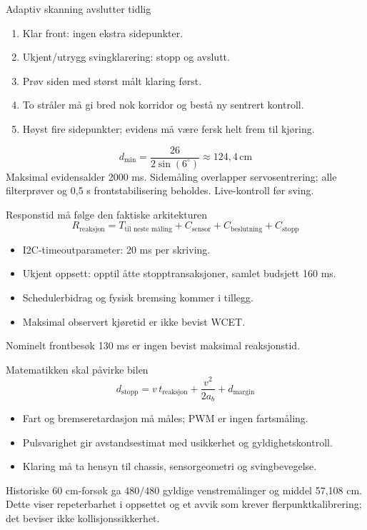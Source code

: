\documentclass[aspectratio=169,11pt]{beamer}
\begin{document}
\begin{frame}{Adaptiv skanning avslutter tidlig}
\begin{enumerate}
\item Klar front: ingen ekstra sidepunkter.
\item Ukjent/utrygg svingklarering: stopp og avslutt.
\item Prøv siden med størst målt klaring først.
\item To stråler må gi bred nok korridor og bestå ny sentrert kontroll.
\item Høyst fire sidepunkter; evidens må være fersk helt frem til kjøring.
\end{enumerate}
\vspace{5mm}
\[
 d_{\min}=\frac{26}{2\sin(6^\circ)}\approx124{,}4\,\mathrm{cm}
\]
\small Maksimal evidensalder 2000 ms. Sidemåling overlapper servosentrering;
alle filterprøver og 0,5 s frontstabilisering beholdes. Live-kontroll før sving.
\end{frame}

\begin{frame}{Responstid må følge den faktiske arkitekturen}
\[
 R_{\mathrm{reaksjon}} = T_{\text{til neste måling}}
   + C_{\mathrm{sensor}} + C_{\mathrm{beslutning}} + C_{\mathrm{stopp}}
\]
\begin{itemize}
\item I2C-timeoutparameter: 20 ms per skriving.
\item Ukjent oppsett: opptil åtte stopptransaksjoner, samlet budsjett 160 ms.
\item Schedulerbidrag og fysisk bremsing kommer i tillegg.
\item Maksimal observert kjøretid er ikke bevist WCET.
\end{itemize}
\vspace{4mm}
\alert{Nominelt frontbesøk 130 ms er ingen bevist maksimal reaksjonstid.}
\end{frame}

\begin{frame}{Matematikken skal påvirke bilen}
\[
 d_{\mathrm{stopp}}=v\,t_{\mathrm{reaksjon}}+\frac{v^2}{2a_b}+d_{\mathrm{margin}}
\]
\begin{itemize}
\item Fart og bremseretardasjon må måles; PWM er ingen fartsmåling.
\item Pulsvarighet gir avstandsestimat med usikkerhet og gyldighetskontroll.
\item Klaring må ta hensyn til chassis, sensorgeometri og svingbevegelse.
\end{itemize}
\vspace{5mm}
Historiske 60 cm-forsøk ga 480/480 gyldige venstremålinger og middel
57,108 cm. Dette viser repeterbarhet i oppsettet og et avvik som krever
flerpunktkalibrering; det beviser ikke kollisjonssikkerhet.
\end{frame}
\end{document}
